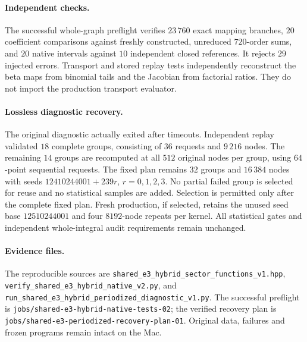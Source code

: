 \documentclass[11pt]{article}
\begin{document}
\paragraph{Independent checks.}
The successful whole-graph preflight verifies $23\,760$ exact mapping
branches, $20$ coefficient comparisons against freshly constructed,
unreduced $720$-order sums, and $20$ native intervals against $10$
independent closed references. It rejects $29$ injected errors.
Transport and stored replay tests independently reconstruct the
beta maps from binomial tails and the Jacobian from factorial ratios.
They do not import the production transport evaluator.

\paragraph{Lossless diagnostic recovery.}
The original diagnostic actually exited after timeouts.
Independent replay validated $18$ complete groups, consisting of
$36$ requests and $9\,216$ nodes. The remaining $14$ groups are
recomputed at all $512$ original nodes per group, using $64$-point
sequential requests. The fixed plan remains $32$ groups and
$16\,384$ nodes with seeds $12410244001+239r$, $r=0,1,2,3$.
No partial failed group is selected for reuse and no statistical samples
are added. Selection is permitted only after the complete fixed plan.
Fresh production, if selected, retains the unused seed base
$12510244001$ and four $8192$-node repeats per kernel.
All statistical gates and independent whole-integral audit requirements
remain unchanged.

\paragraph{Evidence files.}
The reproducible sources are
\texttt{shared\_e3\_hybrid\_sector\_functions\_v1.hpp},
\texttt{verify\_shared\_e3\_hybrid\_native\_v2.py}, and
\texttt{run\_shared\_e3\_hybrid\_periodized\_diagnostic\_v1.py}.
The successful preflight is
\texttt{jobs/shared-e3-hybrid-native-tests-02};
the verified recovery plan is
\texttt{jobs/shared-e3-periodized-recovery-plan-01}.
Original data, failures and frozen programs remain intact on the Mac.
\end{document}
